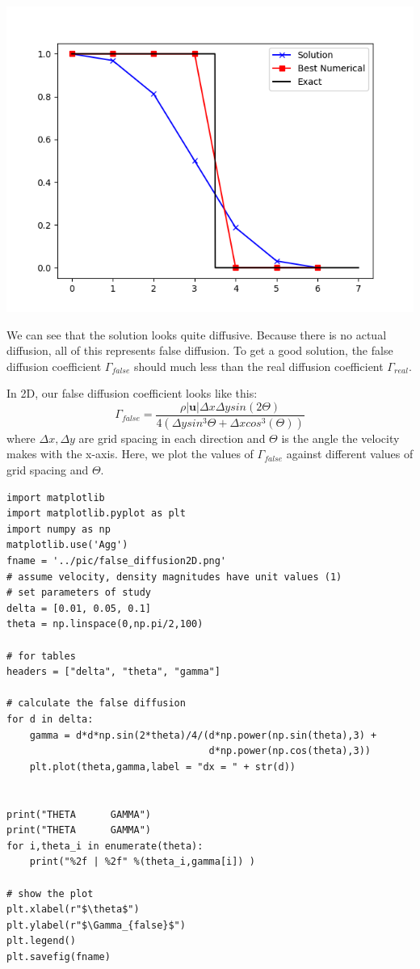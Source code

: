 \documentclass[11pt]{article}
\begin{document}
\begin{center}
\includegraphics[scale=0.8]{../pic/45degreeStep.png}
\end{center}

We can see that the solution looks quite diffusive. Because there is no actual diffusion, all of this
represents false diffusion. To get a good solution, the false diffusion coefficient \(\Gamma_{false}\) should
much less than the real diffusion coefficient \(\Gamma_{real}\).

In 2D, our false diffusion coefficient looks like this:
\begin{equation*}
\Gamma_{false} = \frac{\rho |\textbf{u}|\Delta x \Delta y sin(2\Theta)}{4(\Delta y sin^3{\Theta} +
\Delta x cos^3 (\Theta))}
\end{equation*}
where \(\Delta x, \Delta y\) are grid spacing in each direction and \(\Theta\) is the angle
the velocity makes with the x-axis. Here, we plot the values of \(\Gamma_{false}\) against
different values of grid spacing and \(\Theta\).
\lstset{language=Python,label= ,caption= ,captionpos=b,numbers=none}
\begin{lstlisting}
import matplotlib
import matplotlib.pyplot as plt
import numpy as np
matplotlib.use('Agg')
fname = '../pic/false_diffusion2D.png'
# assume velocity, density magnitudes have unit values (1)
# set parameters of study
delta = [0.01, 0.05, 0.1]
theta = np.linspace(0,np.pi/2,100)

# for tables
headers = ["delta", "theta", "gamma"]

# calculate the false diffusion
for d in delta:
    gamma = d*d*np.sin(2*theta)/4/(d*np.power(np.sin(theta),3) +
                                   d*np.power(np.cos(theta),3))
    plt.plot(theta,gamma,label = "dx = " + str(d))


print("THETA      GAMMA")
print("THETA      GAMMA")
for i,theta_i in enumerate(theta):
    print("%2f | %2f" %(theta_i,gamma[i]) )

# show the plot
plt.xlabel(r"$\theta$")
plt.ylabel(r"$\Gamma_{false}$")
plt.legend()
plt.savefig(fname)
\end{lstlisting}
\end{document}
